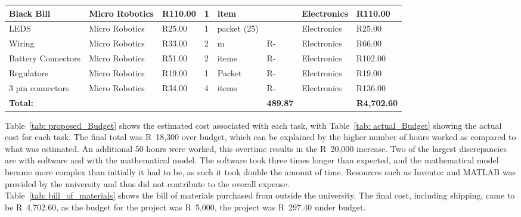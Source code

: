 \begin{landscape}
\begin{table}[H]
\begin{tabular}{|p{5cm}|l|l|l|l|l|l|l|}
                    Black Bill & Micro Robotics &  R110.00  & 1 & item & ~ & Electronics &  R110.00  \\ \hline
                    LEDS & Micro Robotics &  R25.00  & 1 & packet (25) & ~ & Electronics &  R25.00  \\ \hline
                    Wiring  & Micro Robotics &  R33.00  & 2 & m &  R-    & Electronics &  R66.00  \\ \hline
                    Battery Connectors & Micro Robotics &  R51.00  & 2 & items &  R-    & Electronics &  R102.00  \\ \hline
                    Regulators & Micro Robotics &  R19.00  & 1 & Packet &  R-    & Electronics &  R19.00  \\ \hline
                    3 pin connectors & Micro Robotics &  R34.00  & 4 & items &  R-    & Electronics &  R136.00  \\ \hline
                    \textbf{Total:} & ~ & ~ & ~ & ~ &  \textbf{489.87}  & ~ &  \textbf{R4,702.60}  \\ \hline
                \end{tabular}
            \end{table}
        \end{landscape}
        \normalsize
    Table~\ref{tab: proposed_Budget} shows the estimated cost associated with each task, with Table~\ref{tab: actual_Budget} showing the actual cost for each task. The final total was R~18,300 over budget, which can be explained by the higher number of hours worked as compared to what was estimated. An additional 50 hours were worked, this overtime results in the R~20,000 increase. Two of the largest discrepancies are with software and with the mathematical model. The software took three times longer than expected, and the mathematical model became more complex than initially it had to be, as such it took double the amount of time. Resources such as Inventor and MATLAB was provided by the university and thus did not contribute to the overall expense.\\
    Table~\ref{tab: bill_of_materials} shows the bill of materials purchased from outside the university. The final cost, including shipping, came to be R~4,702.60, as the budget for the project was R~5,000, the project was R~297.40 under budget. %
